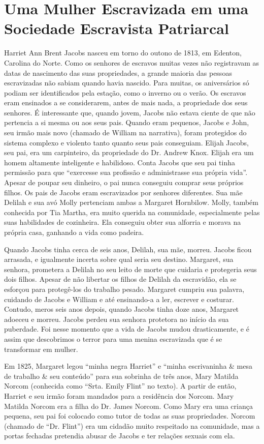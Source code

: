 \section{Uma Mulher Escravizada em uma Sociedade Escravista Patriarcal}

Harriet Ann Brent Jacobs nasceu em torno do outono de 1813, em Edenton,
Carolina do Norte. Como os senhores de escravos muitas vezes não
registravam as datas de nascimento das suas propriedades, a grande
maioria das pessoas escravizadas não sabiam quando havia nascido. Para
muitas, os aniversários só podiam ser identificados pela estação, como o
inverno ou o verão. Os escravos eram ensinados a se considerarem, antes
de mais nada, a propriedade dos seus senhores. É interessante que,
quando jovem, Jacobs não estava ciente de que não pertencia a si mesma
ou aos seus pais. Quando eram pequenos, Jacobs e John, seu irmão mais
novo (chamado de William na narrativa), foram protegidos do sistema
complexo e violento tanto quanto seus pais conseguiam. Elijah Jacobs,
seu pai, era um carpinteiro, da propriedade do Dr. Andrew Knox. Elijah
era um homem altamente inteligente e habilidoso. Conta Jacobs que seu
pai tinha permissão para que ``exercesse sua profissão e administrasse
sua própria vida''. Apesar de poupar seu dinheiro, o pai nunca conseguiu
comprar seus próprios filhos. Os pais de Jacobs eram escravizados por
senhores diferentes. Sua mãe Delilah e sua avó Molly pertenciam ambas a
Margaret Hornbilow. Molly, também conhecida por Tia Martha, era muito
querida na comunidade, especialmente pelas suas habilidades de
cozinheira. Ela conseguiu obter sua alforria e morava na própria casa,
ganhando a vida como padeira.

Quando Jacobs tinha cerca de seis anos, Delilah, sua mãe, morreu. Jacobs
ficou arrasada, e igualmente incerta sobre qual seria seu destino.
Margaret, sua senhora, prometera a Delilah no seu leito de morte que
cuidaria e protegeria seus dois filhos. Apesar de não libertar os filhos
de Delilah da escravidão, ela se esforçou para protegê-los do trabalho
pesado. Margaret cumpriu sua palavra, cuidando de Jacobs e William e até
ensinando-a a ler, escrever e costurar. Contudo, meros seis anos depois,
quando Jacobs tinha doze anos, Margaret adoeceu e morreu. Jacobs perdeu
sua senhora protetora no início da sua puberdade. Foi nesse momento que
a vida de Jacobs mudou drasticamente, e é assim que descobrimos o terror
para uma menina escravizada que é se transformar em mulher.

Em 1825, Margaret legou ``minha negra Harriet'' e ``minha escrivaninha
\& mesa de trabalho \& seu conteúdo'' para sua sobrinha de três anos,
Mary Matilda Norcom (conhecida como ``Srta. Emily Flint'' no texto). A
partir de então, Harriet e seu irmão foram mandados para a residência
dos Norcom. Mary Matilda Norcom era a filha do Dr. James Norcom. Como
Mary era uma criança pequena, seu pai foi colocado como tutor de todas
as suas propriedades. Norcom (chamado de ``Dr. Flint'') era um cidadão
muito respeitado na comunidade, mas a portas fechadas pretendia abusar
de Jacobs e ter relações sexuais com ela.

